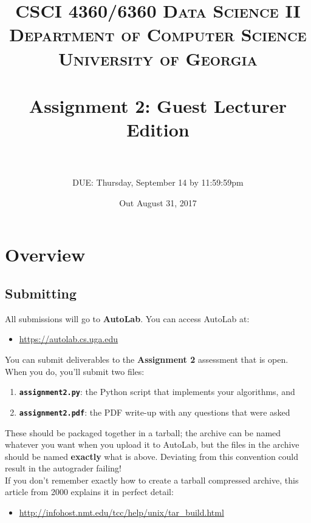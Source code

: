 \documentclass[paper=a4, fontsize=11pt]{scrartcl} %
\title{	
\normalfont \normalsize 
\textsc{CSCI 4360/6360 Data Science II} \\
\textsc{Department of Computer Science} \\
\textsc{University of Georgia} \\ [15pt] %
\horrule{0.5pt} \\[0.3cm] %
\huge Assignment 2: Guest Lecturer Edition \\ %
\horrule{2pt} \\[0.4cm] %
}
\author{DUE: Thursday, September 14 by 11:59:59pm} %
\date{\normalsize Out August 31, 2017}
\numberwithin{figure}{section} %
\numberwithin{table}{section} %
\begin{document}
\maketitle %


\section*{Overview}

\subsection{Submitting}

All submissions will go to \textbf{AutoLab}. You can access AutoLab at:

\begin{itemize}
	\item \url{https://autolab.cs.uga.edu}
\end{itemize}
	
You can submit deliverables to the \textbf{Assignment 2} assessment that is open. When you do, you'll submit two files:

\begin{enumerate}
	\item \texttt{\textbf{assignment2.py}}: the Python script that implements your algorithms, and
	\item \texttt{\textbf{assignment2.pdf}}: the PDF write-up with any questions that were asked
\end{enumerate}

These should be packaged together in a tarball; the archive can be named whatever you want when you upload it to AutoLab, but the files in the archive should be named \textbf{exactly} what is above. Deviating from this convention could result in the autograder failing! \\

If you don't remember exactly how to create a tarball compressed archive, this article from 2000 explains it in perfect detail:

\begin{itemize}
	\item	\url{http://infohost.nmt.edu/tcc/help/unix/tar_build.html}
\end{itemize}
\end{document}

